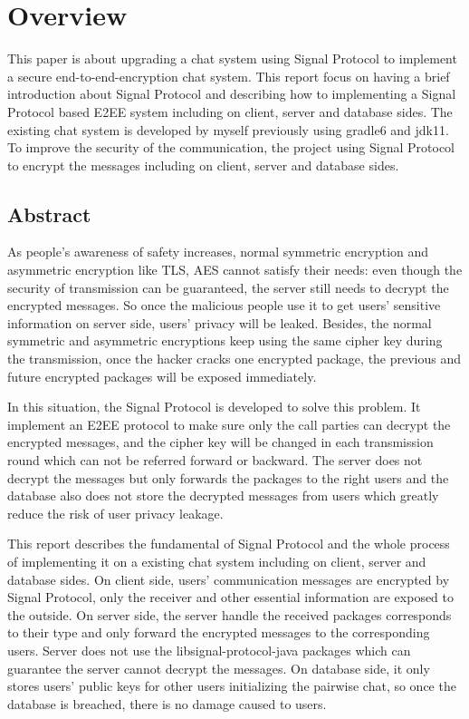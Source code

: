 \section{Overview}
This paper is about upgrading a chat system using Signal Protocol to implement a secure end-to-end-encryption chat system. This report focus on having a brief introduction about Signal Protocol and describing how to implementing a Signal Protocol based E2EE system including on client, server and database sides.
The existing chat system is developed by myself previously using gradle6 and jdk11. To improve the security of the communication, the project using Signal Protocol to encrypt the messages including on client, server and database sides.

\subsection{Abstract}
As people’s awareness of safety increases, normal symmetric encryption and asymmetric encryption like TLS, AES cannot satisfy their needs: even though the security of transmission can be guaranteed, the server still needs to decrypt the encrypted messages. So once the malicious people use it to get users' sensitive information on server side, users' privacy will be leaked. Besides, the normal symmetric and asymmetric encryptions keep  using the same cipher key during the transmission, once the hacker cracks one encrypted package, the previous and future encrypted packages will be exposed immediately.

In this situation, the Signal Protocol is developed to solve this problem. It implement an E2EE protocol to make sure only the call parties can decrypt the encrypted messages, and the cipher key will be changed in each transmission round which can not be referred forward or backward. The server does not decrypt the messages but only forwards the packages to the right users and the database also does not store the decrypted messages from users which greatly reduce the risk of user privacy leakage.

This report describes the fundamental of Signal Protocol and the whole process of implementing it on a existing chat system including on client, server and database sides. On client side, users' communication messages are encrypted by Signal Protocol, only the receiver and other essential information are exposed to the outside. On server side, the server handle the received packages corresponds to their type and only forward the encrypted messages to the corresponding users. Server does not use the libsignal-protocol-java packages which can guarantee the server cannot decrypt the messages. On database side, it only stores users' public keys for other users initializing the pairwise chat, so once the database is breached, there is no damage caused to users.

